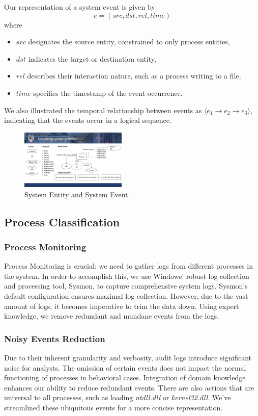 Our representation of a system event is given by
\[ e = (src, dst, rel, time) \]
where
\begin{itemize}
    \item \( src \) designates the source entity, constrained to only process entities,
    \item \( dst \) indicates the target or destination entity,
    \item \( rel \) describes their interaction nature, such as a process writing to a file,
    \item \( time \) specifies the timestamp of the event occurrence.
\end{itemize}
We also illustrated the temporal relationship between events as $\langle e_1 \to e_2 \to e_3 \rangle$, indicating that the events occur in a logical sequence. 



\begin{figure}[ht]
    \centering
      \includegraphics[width=0.45\textwidth]{figs/entity.pdf}
    \caption{System Entity and System Event.}
    \label{fig-entity}
\end{figure}

\subsection{Process Classification}

\subsubsection{Process Monitoring}

Process Monitoring is crucial: we need to gather logs from different processes in the system. In order to accomplish this, we use Windows' robust log collection and processing tool, Sysmon, to capture comprehensive system logs. Sysmon's default configuration ensures maximal log collection. 
However, due to the vast amount of logs, it becomes imperative to trim the data down. Using expert knowledge, we remove redundant and mundane events from the logs.

\subsubsection{Noisy Events Reduction}
Due to their inherent granularity and verbosity, audit logs introduce significant noise for analysts.
The omission of certain events does not impact the normal functioning of processes in behavioral cases. Integration of domain knowledge enhances our ability to reduce redundant events. There are also actions that are universal to all processes, such as loading \textit{ntdll.dll}  or \textit{kernel32.dll}. We've streamlined these ubiquitous events for a more concise representation.

